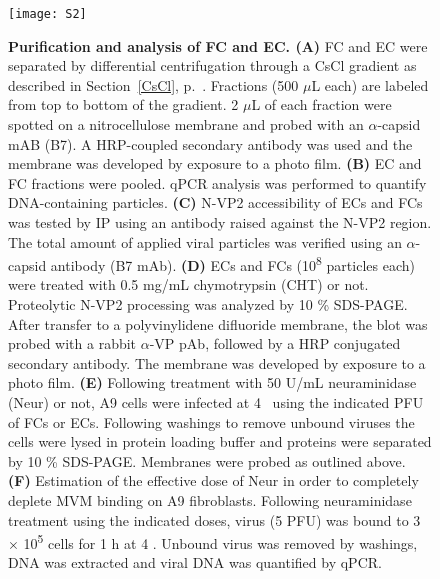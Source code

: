 \begin{figure}

  \begin{minipage}{\textwidth}
\centering
  \texttt{[image: S2]}
  \caption[Purification and analysis of FC and EC.]
   {\textbf{Purification and analysis of FC and EC. (A)} FC and EC were separated by differential centrifugation through a CsCl gradient as described in Section~\ref{CsCl}, p.~\pageref{CsCl}. Fractions (500 $\mu$L each) are labeled from top to bottom of the gradient. 2 $\mu$L of each fraction were spotted on a nitrocellulose membrane and probed with an $\alpha$-capsid mAB (B7). A HRP-coupled secondary antibody was used and the membrane was developed by exposure to a photo film. \textbf{(B)} EC and FC fractions were pooled. qPCR analysis was performed to quantify DNA-containing particles. \textbf{(C)} N-VP2 accessibility of ECs and FCs was tested by IP using an antibody raised against the N-VP2 region. The total amount of applied viral particles was verified using an $\alpha$-capsid antibody (B7 mAb). \textbf{(D)} ECs and FCs (10\textsuperscript{8} particles each) were treated with 0.5 mg/mL chymotrypsin (CHT) or not. Proteolytic N-VP2 processing was analyzed by 10 \% SDS-PAGE. After transfer to a polyvinylidene difluoride membrane, the blot was probed with a rabbit $\alpha$-VP pAb, followed by a HRP conjugated secondary antibody. The membrane was developed by exposure to a photo film. \textbf{(E)} Following treatment with 50 U/mL neuraminidase (Neur) or not, A9 cells were infected at 4 \textcelsius~using the indicated PFU of FCs or ECs\footnotemark. Following washings to remove unbound viruses the cells were lysed in protein loading buffer and proteins were separated by 10 \% SDS-PAGE. Membranes were probed as outlined above. \textbf{(F)} Estimation of the effective dose of Neur in order to completely deplete MVM binding on A9 fibroblasts. Following neuraminidase treatment using the indicated doses, virus (5 PFU) was bound to 3 $\times$ 10\textsuperscript{5} cells for 1 h at 4 \textcelsius. Unbound virus was removed by washings, DNA was extracted and viral DNA was quantified by qPCR.} 
\label{S2}

\vspace{3cm}

 \end{minipage}

\end{figure}





